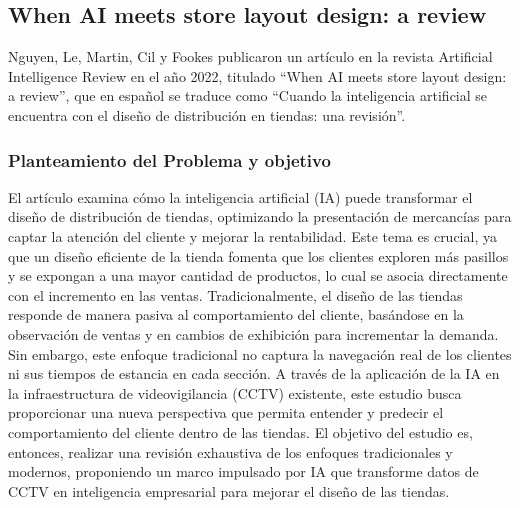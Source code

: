 \subsection{When AI meets store layout design: a review}
Nguyen, Le, Martin, Cil y Fookes publicaron un artículo en la revista Artificial Intelligence Review en el año 2022, titulado “When AI meets store layout design: a review”, que en español se traduce como “Cuando la inteligencia artificial se encuentra con el diseño de distribución en tiendas: una revisión”.

\subsubsection{Planteamiento del Problema y objetivo }
El artículo examina cómo la inteligencia artificial (IA) puede transformar el diseño de distribución de tiendas, optimizando la presentación de mercancías para captar la atención del cliente y mejorar la rentabilidad. Este tema es crucial, ya que un diseño eficiente de la tienda fomenta que los clientes exploren más pasillos y se expongan a una mayor cantidad de productos, lo cual se asocia directamente con el incremento en las ventas. Tradicionalmente, el diseño de las tiendas responde de manera pasiva al comportamiento del cliente, basándose en la observación de ventas y en cambios de exhibición para incrementar la demanda. Sin embargo, este enfoque tradicional no captura la navegación real de los clientes ni sus tiempos de estancia en cada sección. A través de la aplicación de la IA en la infraestructura de videovigilancia (CCTV) existente, este estudio busca proporcionar una nueva perspectiva que permita entender y predecir el comportamiento del cliente dentro de las tiendas. El objetivo del estudio es, entonces, realizar una revisión exhaustiva de los enfoques tradicionales y modernos, proponiendo un marco impulsado por IA que transforme datos de CCTV en inteligencia empresarial para mejorar el diseño de las tiendas.




